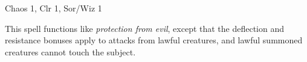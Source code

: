 
\begin{description*}
\item[Level:] Chaos 1, Clr 1, Sor/Wiz 1
\end{description*}

This spell functions like \textit{protection from evil}, except that the deflection
and resistance bonuses apply to attacks from lawful creatures, and lawful summoned
creatures cannot touch the subject.